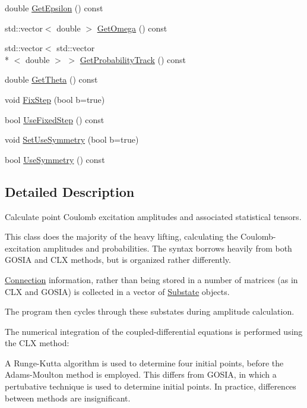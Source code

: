 \begin{DoxyCompactItemize}
double \hyperlink{classPointCoulEx_a1e1d91eff35bba0a4ed36610a8644638}{Get\-Epsilon} () const 
\item 
std\-::vector$<$ double $>$ \hyperlink{classPointCoulEx_a2f447409074ae1105d54bcdf4aaad3fd}{Get\-Omega} () const 
\item 
std\-::vector$<$ std\-::vector\\*
$<$ double $>$ $>$ \hyperlink{classPointCoulEx_a5324fc5b5d28c980ae0919bb7de6bb02}{Get\-Probability\-Track} () const 
\item 
double \hyperlink{classPointCoulEx_a593fc5d2387da403ffaa6ceb12527ba0}{Get\-Theta} () const 
\item 
void \hyperlink{classPointCoulEx_afbc58066003a314f1e5b19251bf6959e}{Fix\-Step} (bool b=true)
\item 
bool \hyperlink{classPointCoulEx_a63faab04c346532eaf2a437dc024f6a0}{Use\-Fixed\-Step} () const 
\item 
void \hyperlink{classPointCoulEx_a4c6fc7e02ef6ef2835a96e0cc7ac7a3f}{Set\-Use\-Symmetry} (bool b=true)
\item 
bool \hyperlink{classPointCoulEx_a41d348c5daa4585811105c18a0175cc7}{Use\-Symmetry} () const 
\end{DoxyCompactItemize}


\subsection{Detailed Description}
Calculate point Coulomb excitation amplitudes and associated statistical tensors. 

This class does the majority of the heavy lifting, calculating the Coulomb-\/excitation amplitudes and probabilities. The syntax borrows heavily from both G\-O\-S\-I\-A and C\-L\-X methods, but is organized rather differently.

\hyperlink{classConnection}{Connection} information, rather than being stored in a number of matrices (as in C\-L\-X and G\-O\-S\-I\-A) is collected in a vector of \hyperlink{classSubstate}{Substate} objects.

The program then cycles through these substates during amplitude calculation.

The numerical integration of the coupled-\/differential equations is performed using the C\-L\-X method\-:\par
A Runge-\/\-Kutta algorithm is used to determine four initial points, before the Adams-\/\-Moulton method is employed. This differs from G\-O\-S\-I\-A, in which a pertubative technique is used to determine initial points. In practice, differences between methods are insignificant.

